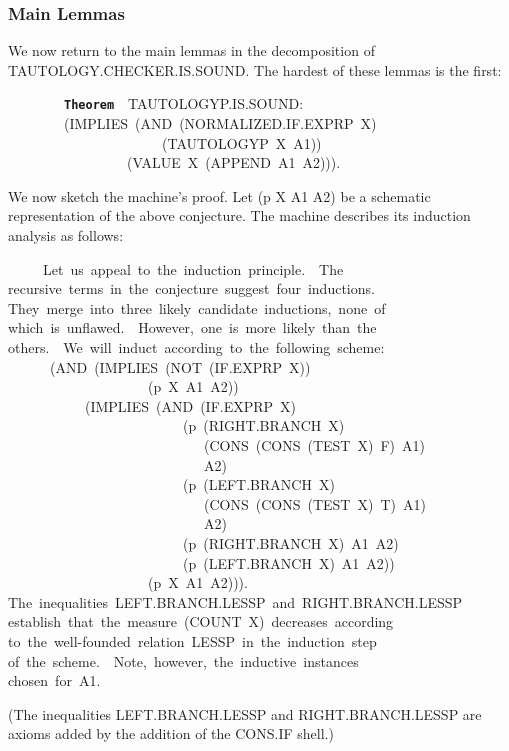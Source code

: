 \documentclass[11pt]{book}
\newenvironment{pubasis}{\begin{flushleft}\ttfamily\small}{\normalsize\rmfamily\end{flushleft}}
\newcommand{\axiomordefinition}[1]{\vspace{6pt}\texttt{\textbf{#1}}}
\newcommand{\pubdefaulttextsize}{\large}
\begin{document}
\subsubsection{Main Lemmas}
\pubdefaulttextsize
We now return to the main lemmas in the
decomposition of TAU\-TOL\-OGY.CHECK\-ER.IS.SOUND.  The hardest of these lemmas is
the first:
\begin{pubasis}
~~~~~~~~\axiomordefinition{Theorem}~~TAU\-TOL\-OGYP.IS.SOUND:\\
~~~~~~~~(IMPLIES~(AND~(NOR\-MAL\-IZED.IF.EXPRP~X)\\
~~~~~~~~~~~~~~~~~~~~~~(TAUTOLOGYP~X~A1))\\
~~~~~~~~~~~~~~~~~(VALUE~X~(APPEND~A1~A2))).\\
\end{pubasis}
We now sketch the machine's proof.  Let (p X A1 A2) be a schematic
representation of the above conjecture.  The machine describes
its induction analysis as follows:
\begin{pubasis}
~~~~~Let~us~appeal~to~the~induction~principle.~~The\\
recursive~terms~in~the~conjecture~suggest~four~inductions.\\
They~merge~into~three~likely~candidate~inductions,~none~of\\
which~is~unflawed.~~However,~one~is~more~likely~than~the\\
others.~~We~will~induct~according~to~the~following~scheme:\\
~~~~~~(AND~(IMPLIES~(NOT~(IF.EXPRP~X))\\
~~~~~~~~~~~~~~~~~~~~(p~X~A1~A2))\\
~~~~~~~~~~~(IMPLIES~(AND~(IF.EXPRP~X)\\
~~~~~~~~~~~~~~~~~~~~~~~~~(p~(RIGHT.BRANCH~X)\\
~~~~~~~~~~~~~~~~~~~~~~~~~~~~(CONS~(CONS~(TEST~X)~F)~A1)\\
~~~~~~~~~~~~~~~~~~~~~~~~~~~~A2)\\
~~~~~~~~~~~~~~~~~~~~~~~~~(p~(LEFT.BRANCH~X)\\
~~~~~~~~~~~~~~~~~~~~~~~~~~~~(CONS~(CONS~(TEST~X)~T)~A1)\\
~~~~~~~~~~~~~~~~~~~~~~~~~~~~A2)\\
~~~~~~~~~~~~~~~~~~~~~~~~~(p~(RIGHT.BRANCH~X)~A1~A2)\\
~~~~~~~~~~~~~~~~~~~~~~~~~(p~(LEFT.BRANCH~X)~A1~A2))\\
~~~~~~~~~~~~~~~~~~~~(p~X~A1~A2))).\\
The~inequalities~LEFT.BRANCH.LESSP~and~RIGHT.BRANCH.LESSP\\
establish~that~the~measure~(COUNT~X)~decreases~according\\
to~the~well-founded~relation~LESSP~in~the~induction~step\\
of~the~scheme.~~Note,~however,~the~inductive~instances\\
chosen~for~A1.\\
\end{pubasis}
(The inequalities LEFT.BRANCH.LESSP and RIGHT.BRANCH.LESSP
are axioms added by the addition of the CONS.IF shell.)
\end{document}
